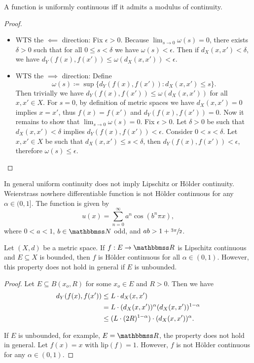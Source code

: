 \documentclass[screen,single]{techreport}
\numberwithin{equation}{section}
\begin{document}
\begin{proposition}\label{Prop:UnifContIffModCont}
  A function is uniformly continuous iff it admits a modulus of continuity.
\end{proposition}
\begin{proof}\
  \begin{itemize}
    \item WTS the $\impliedby$ direction: Fix $\epsilon > 0$.
    Because $\lim_{s \to 0} \omega(s) = 0$, there exists $\delta > 0$ such that for all $0 \le s < \delta$ we have $\omega(s) < \epsilon$.
    Then if $d_X(x,x') < \delta$, we have $d_Y(f(x),f(x')) \le \omega(d_X(x,x')) < \epsilon$.
    
    \item WTS the $\implies$ direction: Define
    \[
    \omega(s) \coloneqq \sup\{ d_Y(f(x),f(x')) : d_X(x,x') \le s \}.
    \]
    Then trivially we have $d_Y(f(x),f(x')) \le \omega(d_X(x,x'))$ for all $x,x' \in X$.
    For $s = 0$, by definition of metric spaces we have $d_X(x,x') = 0$ implies $x=x'$, thus $f(x) = f(x')$ and $d_Y(f(x),f(x')) = 0$.
    Now it remains to show that $\lim_{s \to 0} \omega(s) = 0$.
    Fix $\epsilon > 0$.
    Let $\delta > 0$ be such that $d_X(x,x') < \delta$ implies $d_Y(f(x),f(x')) < \epsilon$.
    Consider $0 < s < \delta$.
    Let $x,x' \in X$ be such that $d_X(x,x') \le s < \delta$, then $d_Y(f(x),f(x')) < \epsilon$, therefore $\omega(s) \le \epsilon$.
  \end{itemize}
\end{proof}

\begin{remark}\label{Rem:UnifContNotImplyLipHolder}
  In general uniform continuity does not imply Lipschitz or H{\"o}lder continuity.
  Weierstrass nowhere differentiable function is not H{\"o}lder continuous for any $\alpha \in (0,1]$.
  The function is given by
  \[
  u(x) = \sum_{n=0}^\infty a^n \cos(b^n \pi x),
  \]
  where $0 < a < 1$, $b \in \bbN$ odd, and $ab > 1 + \sfrac{3\pi}{2}$.
\end{remark}

\begin{remark}\label{Rem:LipImplyHolder}
  Let $(X,d)$ be a metric space.
  If $f : E \to \bbR$ is Lipschitz continuous and $E \subseteq X$ is bounded, then $f$ is H{\"o}lder continuous for all $\alpha \in (0,1)$.
  However, this property does not hold in general if $E$ is unbounded.
\end{remark}
\begin{proof}
  Let $E \subseteq B(x_o,R)$ for some $x_o \in E$ and $R > 0$.
  Then we have
  \begin{align*}
    d_Y(f(x),f(x')) & \le L \cdot d_X(x,x') \\
    & = L \cdot ({ d_X(x,x') })^\alpha ({ d_X(x,x')})^{1-\alpha} \\
    & \le ({ L \cdot (2R)^{1-\alpha} }) \cdot ({d_X(x,x')})^\alpha.
  \end{align*}
  
  If $E$ is unbounded, for example, $E = \bbR$, the property does not hold in general.
  Let $f(x) = x$ with $\mathrm{lip}(f) = 1$.
  However, $f$ is not H{\"o}lder continuous for any $\alpha \in (0,1)$.
\end{proof}
\end{document}
